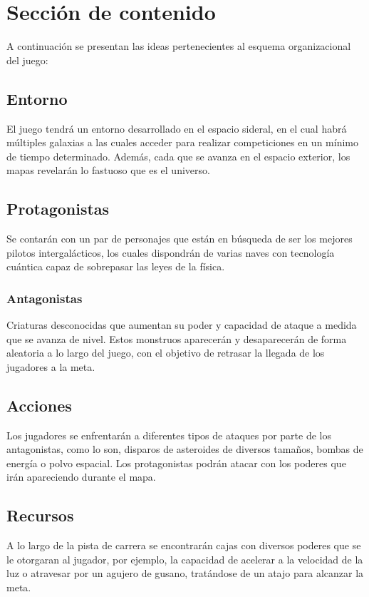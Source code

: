 \documentclass{article}
\begin{document}
\section{Sección de contenido} \label{contenido}
A continuación se presentan las ideas pertenecientes al esquema organizacional del juego:

\subsection{Entorno}
El juego tendrá un entorno desarrollado en el espacio sideral, en el cual habrá múltiples galaxias a las cuales acceder para realizar competiciones en un mínimo de tiempo determinado.
Además, cada que se avanza en el espacio exterior, los mapas revelarán lo fastuoso que es el universo.

\subsection{Protagonistas}
Se contarán con un par de personajes que están en búsqueda de ser los mejores pilotos intergalácticos, los cuales dispondrán de varias naves con tecnología cuántica capaz de sobrepasar las leyes de la física.

\subsubsection{Antagonistas}
Criaturas desconocidas que aumentan su poder y capacidad de ataque a medida que se avanza de nivel. Estos monstruos aparecerán y desaparecerán de forma aleatoria a lo largo del juego, con el objetivo de retrasar la llegada de los jugadores a la meta.

\subsection{Acciones}
Los jugadores se enfrentarán a diferentes tipos de ataques por parte de los antagonistas, como lo son, disparos de asteroides de diversos tamaños, bombas de energía o polvo espacial.
Los protagonistas podrán atacar con los poderes que irán apareciendo durante el mapa.

\subsection{Recursos}
A lo largo de la pista de carrera se encontrarán cajas con diversos poderes que se le otorgaran al jugador, por ejemplo, la capacidad de acelerar a la velocidad de la luz o atravesar por un agujero de gusano, tratándose de un atajo para alcanzar la meta.
\end{document}
